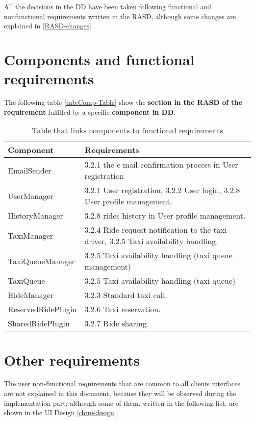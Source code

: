All the decisions in the DD have been taken following functional and nonfunctional requirements written in the RASD, although some changes are explained in \autoref{RASD-changes}.

\section{Components and functional requirements}

The following table \autoref{tab:Comp-Table} show the {\bf section in the RASD of the requirement} fulfilled by a specific {\bf component in DD}. 


\begin{table}[h]
\begin{center}
\begin{tabular}{|p{}|p{}|}
\hline
{\bf Component}  & {\bf Requirements}\\
\hline
EmailSender & 3.2.1 the e-mail confirmation process in User registration \\
\hline
UserManager & 3.2.1 User registration, 3.2.2 User login, 3.2.8 User profile management.\\
\hline
HistoryManager & 3.2.8 rides history in User profile management.\\
\hline
TaxiManager & 3.2.4 Ride request notification to the taxi driver, 3.2.5 Taxi availability handling.\\
\hline
TaxiQueueManager & 3.2.5 Taxi availability handling (taxi queue management) \\
\hline
TaxiQueue & 3.2.5 Taxi availability handling (taxi queue)\\
\hline
RideManager & 3.2.3 Standard taxi call.\\
\hline 
ReservedRidePlugin & 3.2.6 Taxi reservation.\\
\hline
SharedRidePlugin & 3.2.7 Ride sharing.\\
\hline
\end{tabular}
\caption{Table that links components to functional requirements}
\label{tab:Comp-Table}
\end{center}
\end{table}

\section{Other requirements}


The user non-functional requirements that are common to all clients interfaces are not explained in this document, because they will be observed during the implementation part; although some of them, written in the following list, are shown in the UI Design \autoref{ch:ui-design}.

